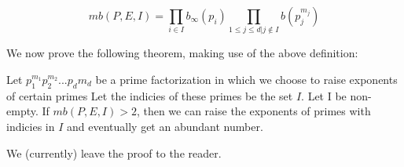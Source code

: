 \documentclass[../paper.tex]{article}
\begin{document}
$$mb(P,E,I) = \prod_{i \in I} b_{\infty}(p_i) 
\prod_{1 \leq j \leq d | j \notin I} b(p_j^{m_j})
$$

We now prove the following theorem, making use of the above definition:

\begin{theorem}
Let $p_1^{m_1} p_2^{m_2} ... p_d{m_d}$ be a prime factorization 
in which we choose to raise exponents of certain primes Let the 
indicies of these primes be the set $I$. Let I be non-empty. If
$mb(P,E,I) > 2$, then we can raise the exponents of primes with 
indicies in $I$ and eventually get an abundant number.
\end{theorem}

We (currently) leave the proof to the reader.
\end{document}
